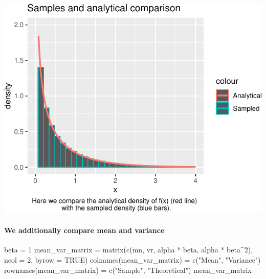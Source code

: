 \documentclass[
]{article}
\newenvironment{Shaded}{\begin{snugshade}}{\end{snugshade}}
\newcommand{\AttributeTok}[1]{\textcolor[rgb]{0.77,0.63,0.00}{#1}}
\newcommand{\ConstantTok}[1]{\textcolor[rgb]{0.00,0.00,0.00}{#1}}
\newcommand{\DecValTok}[1]{\textcolor[rgb]{0.00,0.00,0.81}{#1}}
\newcommand{\FunctionTok}[1]{\textcolor[rgb]{0.00,0.00,0.00}{#1}}
\newcommand{\NormalTok}[1]{#1}
\newcommand{\OtherTok}[1]{\textcolor[rgb]{0.56,0.35,0.01}{#1}}
\newcommand{\SpecialCharTok}[1]{\textcolor[rgb]{0.00,0.00,0.00}{#1}}
\newcommand{\StringTok}[1]{\textcolor[rgb]{0.31,0.60,0.02}{#1}}
\begin{document}
\begin{center}\includegraphics{Project-1_files/figure-latex/unnamed-chunk-4-1} \end{center}

\hypertarget{we-additionally-compare-mean-and-variance}{%
\paragraph{We additionally compare mean and
variance}\label{we-additionally-compare-mean-and-variance}}

\begin{Shaded}
\begin{Highlighting}[]
\NormalTok{beta }\OtherTok{=} \DecValTok{1}
\NormalTok{mean\_var\_matrix }\OtherTok{=} \FunctionTok{matrix}\NormalTok{(}\FunctionTok{c}\NormalTok{(mn, vr, alpha }\SpecialCharTok{*}\NormalTok{ beta, alpha }\SpecialCharTok{*}\NormalTok{ beta}\SpecialCharTok{\^{}}\DecValTok{2}\NormalTok{), }\AttributeTok{ncol =} \DecValTok{2}\NormalTok{, }\AttributeTok{byrow =} \ConstantTok{TRUE}\NormalTok{)}
\FunctionTok{colnames}\NormalTok{(mean\_var\_matrix) }\OtherTok{=} \FunctionTok{c}\NormalTok{(}\StringTok{"Mean"}\NormalTok{, }\StringTok{"Variance"}\NormalTok{)}
\FunctionTok{rownames}\NormalTok{(mean\_var\_matrix) }\OtherTok{=} \FunctionTok{c}\NormalTok{(}\StringTok{"Sample"}\NormalTok{, }\StringTok{"Theoretical"}\NormalTok{)}
\NormalTok{mean\_var\_matrix}
\end{Highlighting}
\end{Shaded}
\end{document}

